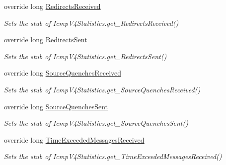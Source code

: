 \begin{DoxyCompactItemize}
override long \hyperlink{class_system_1_1_net_1_1_network_information_1_1_fakes_1_1_stub_icmp_v4_statistics_ad3902ecd0244163a3105ed1245d0659a}{Redirects\-Received}
\begin{DoxyCompactList}\small\item\em Sets the stub of Icmp\-V4\-Statistics.\-get\-\_\-\-Redirects\-Received()\end{DoxyCompactList}\item 
override long \hyperlink{class_system_1_1_net_1_1_network_information_1_1_fakes_1_1_stub_icmp_v4_statistics_a45ec7982a70d18e10907802a856a9dd6}{Redirects\-Sent}
\begin{DoxyCompactList}\small\item\em Sets the stub of Icmp\-V4\-Statistics.\-get\-\_\-\-Redirects\-Sent()\end{DoxyCompactList}\item 
override long \hyperlink{class_system_1_1_net_1_1_network_information_1_1_fakes_1_1_stub_icmp_v4_statistics_a19cc88138da54e4525f24ec3be130d73}{Source\-Quenches\-Received}
\begin{DoxyCompactList}\small\item\em Sets the stub of Icmp\-V4\-Statistics.\-get\-\_\-\-Source\-Quenches\-Received()\end{DoxyCompactList}\item 
override long \hyperlink{class_system_1_1_net_1_1_network_information_1_1_fakes_1_1_stub_icmp_v4_statistics_a08b53d9465288e5cb607ce0f81b5670f}{Source\-Quenches\-Sent}
\begin{DoxyCompactList}\small\item\em Sets the stub of Icmp\-V4\-Statistics.\-get\-\_\-\-Source\-Quenches\-Sent()\end{DoxyCompactList}\item 
override long \hyperlink{class_system_1_1_net_1_1_network_information_1_1_fakes_1_1_stub_icmp_v4_statistics_a3331fe2507c406fd3600a0453e4b64a7}{Time\-Exceeded\-Messages\-Received}
\begin{DoxyCompactList}\small\item\em Sets the stub of Icmp\-V4\-Statistics.\-get\-\_\-\-Time\-Exceeded\-Messages\-Received()\end{DoxyCompactList}\item 

\end{DoxyCompactItemize}
